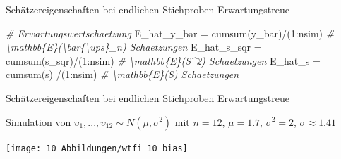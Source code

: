 \documentclass[
  8pt,
  ignorenonframetext,
]{beamer}
\newenvironment{Shaded}{\begin{snugshade}}{\end{snugshade}}
\newcommand{\CommentTok}[1]{\textcolor[rgb]{0.56,0.35,0.01}{\textit{#1}}}
\newcommand{\DecValTok}[1]{\textcolor[rgb]{0.00,0.00,0.81}{#1}}
\newcommand{\FunctionTok}[1]{\textcolor[rgb]{0.00,0.00,0.00}{#1}}
\newcommand{\NormalTok}[1]{#1}
\newcommand{\OtherTok}[1]{\textcolor[rgb]{0.56,0.35,0.01}{#1}}
\newcommand{\SpecialCharTok}[1]{\textcolor[rgb]{0.00,0.00,0.00}{#1}}
\newcommand{\ups} {\upsilon}
\begin{document}
\begin{frame}[fragile]{\small Schätzereigenschaften bei endlichen
Stichproben \textbar{} Erwartungstreue}
\begin{Shaded}
\begin{Highlighting}[]
\CommentTok{\# Erwartungswertschaetzung}
\NormalTok{E\_hat\_y\_bar }\OtherTok{=} \FunctionTok{cumsum}\NormalTok{(y\_bar)}\SpecialCharTok{/}\NormalTok{(}\DecValTok{1}\SpecialCharTok{:}\NormalTok{nsim) }\CommentTok{\# \textbackslash{}mathbb\{E\}(\textbackslash{}bar\{\textbackslash{}ups\}\_n) Schaetzungen}
\NormalTok{E\_hat\_s\_sqr }\OtherTok{=} \FunctionTok{cumsum}\NormalTok{(s\_sqr)}\SpecialCharTok{/}\NormalTok{(}\DecValTok{1}\SpecialCharTok{:}\NormalTok{nsim) }\CommentTok{\# \textbackslash{}mathbb\{E\}(S\^{}2) Schaetzungen}
\NormalTok{E\_hat\_s     }\OtherTok{=} \FunctionTok{cumsum}\NormalTok{(s)    }\SpecialCharTok{/}\NormalTok{(}\DecValTok{1}\SpecialCharTok{:}\NormalTok{nsim) }\CommentTok{\# \textbackslash{}mathbb\{E\}(S) Schaetzungen}
\end{Highlighting}
\end{Shaded}
\end{frame}

\begin{frame}{\small Schätzereigenschaften bei endlichen Stichproben
\textbar{} Erwartungstreue}
\protect\hypertarget{schuxe4tzereigenschaften-bei-endlichen-stichproben-erwartungstreue-7}{}
\small

Simulation von \(\ups_1,...,\ups_{12} \sim N(\mu,\sigma^2)\) mit
\(n = 12\), \(\mu = 1.7\), \(\sigma^2 = 2\), \(\sigma \approx 1.41\)

\begin{center}\texttt{[image: 10\_Abbildungen/wtfi\_10\_bias]} \end{center}
\end{frame}
\end{document}
